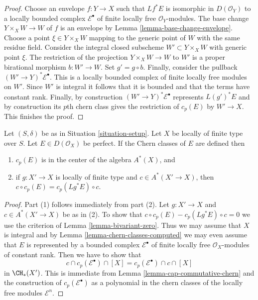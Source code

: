 \begin{proof}
Choose an envelope $f : Y \to X$ such that $Lf^*E$ is isomorphic in
$D(\mathcal{O}_Y)$ to a locally bounded complex $\mathcal{E}^\bullet$
of finite locally free $\mathcal{O}_Y$-modules. The base change
$Y \times_X W \to W$ of $f$ is an envelope by
Lemma \ref{lemma-base-change-envelope}. Choose a point
$\xi \in Y \times_X W$ mapping to the generic point of $W$
with the same residue field. Consider the integral closed subscheme
$W' \subset Y \times_X W$ with generic point $\xi$. The restriction
of the projection $Y \times_X W \to W$ to $W'$ is a proper birational
morphism $b : W' \to W$. Set $g' = g \circ b$. Finally, consider the
pullback $(W' \to Y)^*\mathcal{E}^\bullet$. This is a locally bounded
complex of finite locally free modules on $W'$. Since $W'$ is integral
it follows that it is bounded and that the terms have constant rank.
Finally, by construction $(W' \to Y)^*\mathcal{E}^\bullet$
represents $L(g')^*E$ and by construction its $p$th chern class
gives the restriction of $c_p(E)$ by $W' \to X$. This finishes the proof.
\end{proof}

\begin{lemma}
\label{lemma-commutative-chern-perfect}
Let $(S, \delta)$ be as in Situation \ref{situation-setup}.
Let $X$ be locally of finite type over $S$.
Let $E \in D(\mathcal{O}_X)$ be perfect. If the Chern classes
of $E$ are defined then
\begin{enumerate}
\item $c_p(E)$ is in the center of the algebra $A^*(X)$, and
\item if $g : X' \to X$ is locally of finite type and $c \in A^*(X' \to X)$,
then $c \circ c_p(E) = c_p(Lg^*E) \circ c$.
\end{enumerate}
\end{lemma}

\begin{proof}
Part (1) follows immediately from part (2). Let $g : X' \to X$ and
$c \in A^*(X' \to X)$ be as in (2). To show that
$c \circ c_p(E) - c_p(Lg^*E) \circ c = 0$ we use the criterion of
Lemma \ref{lemma-bivariant-zero}. Thus we may assume that $X$
is integral and by Lemma \ref{lemma-chern-classes-computed}
we may even assume that $E$ is represented
by a bounded complex $\mathcal{E}^\bullet$
of finite locally free $\mathcal{O}_X$-modules of constant rank.
Then we have to show that
$$
c \cap c_p(\mathcal{E}^\bullet) \cap [X] =
c_p(\mathcal{E}^\bullet) \cap c \cap [X] 
$$
in $\CH_*(X')$. This is immediate from
Lemma \ref{lemma-cap-commutative-chern} and the construction
of $c_p(\mathcal{E}^\bullet)$ as a polynomial in the
chern classes of the locally free modules $\mathcal{E}^n$.
\end{proof}

